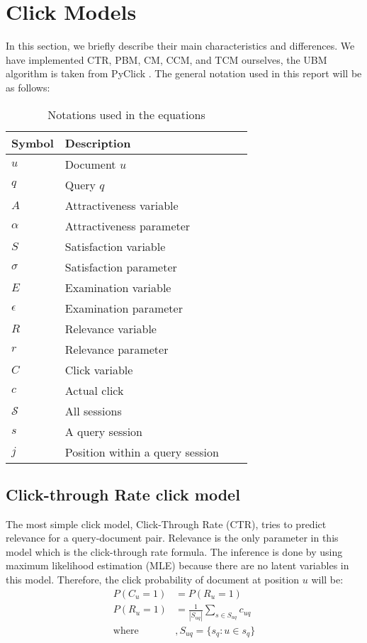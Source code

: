 \section{Click Models}
\label{sec:methodology}
In this section, we briefly describe their main characteristics and differences. We have implemented CTR, PBM, CM, CCM, and TCM ourselves, the UBM algorithm is taken from PyClick \cite{PyClick}. The general notation used in this report will be as follows:

\begin{table}[ht]
	\centering
	\begin{tabular}{l|lll|}
		\hline
		Symbol & Description \\
		\hline
		$u$	& Document $u$ \\
		$q$	& Query $q$ \\
		$ A $ & Attractiveness variable \\
		$ \alpha $ & Attractiveness parameter \\
		$ S $ & Satisfaction variable \\
		$ \sigma $ & Satisfaction parameter \\
		$ E $ & Examination variable \\
		$ \epsilon $ & Examination parameter \\
		$ R $ & Relevance variable \\
		$ r $ & Relevance parameter \\
		$ C $ & Click variable \\
		$ c $ & Actual click \\
		$ \mathcal{S} $ & All sessions \\
		$ s $ & A query session \\
		$ j $ & Position within a query session \\
		\hline
	\end{tabular}
	\caption{Notations used in the equations}
	\label{table:notations}
\end{table}

\subsection{Click-through Rate click model}
The most simple click model, Click-Through Rate (CTR), tries to predict relevance for a query-document pair. Relevance is the only parameter in this model which is the click-through rate formula. The inference is done by using maximum likelihood estimation (MLE) because there are no latent variables in this model. Therefore, the click probability of document at position $u$ will be:
\begin{align}
	P(C_{u}=1) &= P(R_u=1) \nonumber \\
	P(R_{u}=1) &= \frac{1}{|S_{uq}|} \sum_{s \in S_{uq}} c_{uq} \label{eq:ctr_rel}\\
	\text{where}&, S_{uq} = \{ s_q : u \in s_q \} \nonumber
\end{align}

